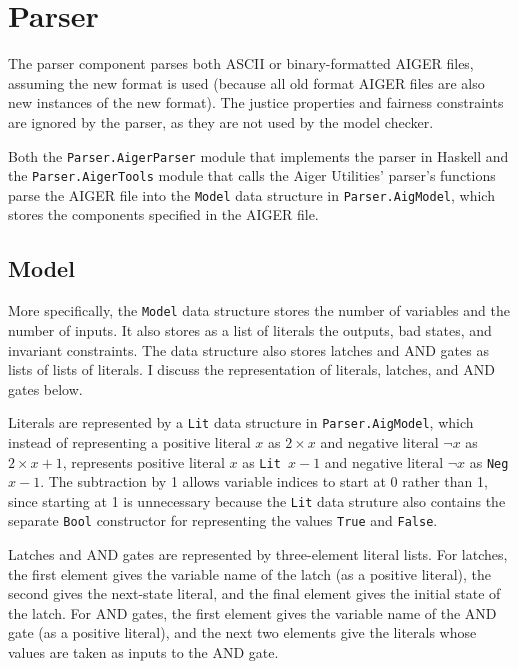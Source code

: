\documentclass[12pt,a4paper,twoside,openright]{report}
\begin{document}
\section{Parser}

The parser component parses both ASCII or binary-formatted AIGER files,
assuming the new format is used (because all old format AIGER files are also
new instances of the new format). The justice properties and fairness constraints
are ignored by the parser, as they are not used by the model checker.

Both the \verb,Parser.AigerParser, module that implements the parser in Haskell and
the \verb,Parser.AigerTools, module that calls the Aiger Utilities' parser's functions
parse the AIGER file into the \verb,Model, data structure in \verb,Parser.AigModel,,
which stores the components specified in the AIGER file.

\subsection{Model}

More specifically, the \verb,Model, data structure stores the number of variables and
the number of inputs. It also stores as a list of literals the outputs, bad states,
and invariant constraints. The data structure also stores latches and AND gates as
lists of lists of literals. I discuss the representation of literals, latches, and
AND gates below.

Literals are represented by a \verb,Lit, data structure in \verb,Parser.AigModel,,
which instead of representing a positive literal $x$ as $2 \times x$ and negative
literal $\neg x$ as $2 \times x + 1$, represents positive literal $x$ as
\verb,Lit ,$x - 1$ and negative literal $\neg x$ as \verb,Neg ,$x - 1$. The subtraction
by 1 allows variable indices to start at 0 rather than 1, since starting at 1 is
unnecessary because the \verb,Lit, data struture also contains the separate
\verb,Bool, constructor for representing the values \verb,True, and \verb,False,.

Latches and AND gates are represented by three-element literal lists.
For latches, the first element gives the variable name of the latch (as a positive literal),
the second gives the next-state literal, and the final element gives the initial state
of the latch. For AND gates, the first element gives the variable name of the AND gate
(as a positive literal), and the next two elements give the literals whose values are taken
as inputs to the AND gate.
\end{document}
